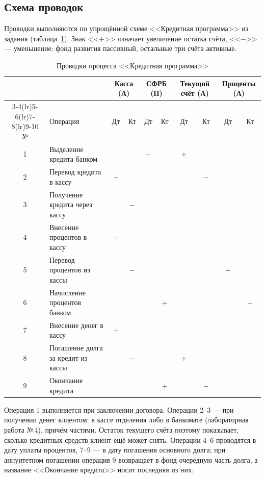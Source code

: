 \documentclass[14pt,a4paper]{extarticle}
\begin{document}
\subsection{Схема проводок}

Проводки выполняются по упрощённой схеме <<Кредитная программа>> из задания
(таблица~\ref{tab:postings}). Знак <<$+$>> означает увеличение остатка счёта, <<$-$>> ---
уменьшение: фонд развития пассивный, остальные три счёта активные.

\begin{table}[H]
\caption{Проводки процесса <<Кредитная программа>>}
\label{tab:postings}
\centering
\footnotesize
\setlength{\tabcolsep}{4.5pt}
\begin{tabular}{clcccccccc}
\toprule
 & & \multicolumn{2}{c}{Касса (А)} & \multicolumn{2}{c}{СФРБ (П)} & \multicolumn{2}{c}{Текущий счёт (А)} & \multicolumn{2}{c}{Проценты (А)} \\
\cmidrule(lr){3-4}\cmidrule(lr){5-6}\cmidrule(lr){7-8}\cmidrule(lr){9-10}
№ & Операция & Дт & Кт & Дт & Кт & Дт & Кт & Дт & Кт \\
\midrule
1 & Выделение кредита банком & & & $-$ & & $+$ & & & \\
2 & Перевод кредита в кассу & $+$ & & & & & $-$ & & \\
3 & Получение кредита через кассу & & $-$ & & & & & & \\
\midrule
4 & Внесение процентов в кассу & $+$ & & & & & & & \\
5 & Перевод процентов из кассы & & $-$ & & & & & $+$ & \\
6 & Начисление процентов банком & & & & $+$ & & & & $-$ \\
\midrule
7 & Внесение денег в кассу & $+$ & & & & & & & \\
8 & Погашение долга за кредит из кассы & & $-$ & & & $+$ & & & \\
9 & Окончание кредита & & & & $+$ & & $-$ & & \\
\bottomrule
\end{tabular}
\end{table}

Операция 1 выполняется при заключении договора. Операции 2--3 --- при получении денег
клиентом: в кассе отделения либо в банкомате (лабораторная работа №\,4), причём частями.
Остаток текущего счёта поэтому показывает, сколько кредитных средств клиент ещё может снять.
Операции 4--6 проводятся в дату уплаты процентов, 7--9 --- в дату погашения основного долга;
при аннуитетном погашении операция 9 возвращает в фонд очередную часть долга, а название
<<Окончание кредита>> носит последняя из них.
\end{document}
